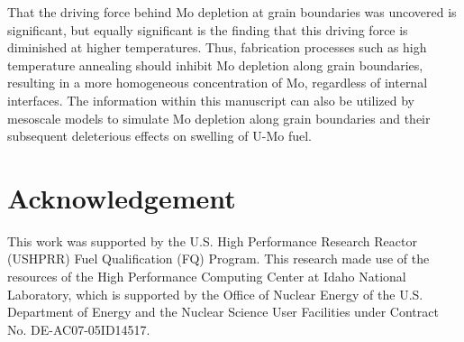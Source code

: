 \documentclass[review]{elsarticle}
\begin{document}
That the driving force behind Mo depletion at grain boundaries was uncovered is significant, but equally significant is the finding that this driving force is diminished at higher temperatures. Thus, fabrication processes such as high temperature annealing should inhibit Mo depletion along grain boundaries, resulting in a more homogeneous concentration of Mo, regardless of internal interfaces. The information within this manuscript can also be utilized by mesoscale models to simulate Mo depletion along grain boundaries and their subsequent deleterious effects on swelling of U-Mo fuel.

\section{Acknowledgement}
This work was supported by the U.S. High Performance Research Reactor (USHPRR) Fuel Qualification (FQ) Program. This research made use of the resources of the High Performance Computing Center at Idaho National Laboratory, which is supported by the Office of Nuclear Energy of the U.S. Department of Energy and the Nuclear Science User Facilities under Contract No. DE-AC07-05ID14517.


\end{document}
